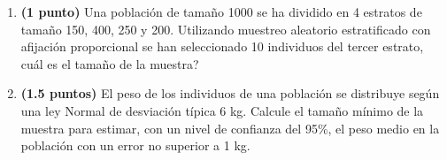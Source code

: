 
\begin{enumerate}[label=\alph*)]
\item \textbf{(1 punto)} Una población de tamaño 1000 se ha dividido en 4 estratos de tamaño 150, 400, 250 y 200. Utilizando muestreo aleatorio estratificado con afijación proporcional se han seleccionado 10 individuos del tercer estrato, \textquestiondown{}cuál es el tamaño de la muestra?
\item \textbf{(1.5 puntos)} El peso de los individuos de una población se distribuye según una ley Normal de desviación típica 6 kg. Calcule el tamaño mínimo de la muestra para estimar, con un nivel de confianza del 95\%, el peso medio en la población con un error no superior a 1 kg.
\end{enumerate}
